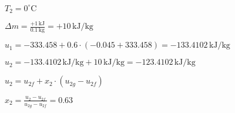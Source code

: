 \( T_2 = 0^\circ \text{C} \)  

\( \Delta m = \frac{+1 \, \text{kJ}}{0.1 \, \text{kg}} = +10 \, \text{kJ/kg} \)  

\( u_1 = -333.458 + 0.6 \cdot (-0.045 + 333.458) = -133.4102 \, \text{kJ/kg} \)  

\( u_2 = -133.4102 \, \text{kJ/kg} + 10 \, \text{kJ/kg} = -123.4102 \, \text{kJ/kg} \)  

\( u_2 = u_{2f} + x_2 \cdot (u_{2g} - u_{2f}) \)  

\( x_2 = \frac{u_2 - u_{2f}}{u_{2g} - u_{2f}} = 0.63 \)